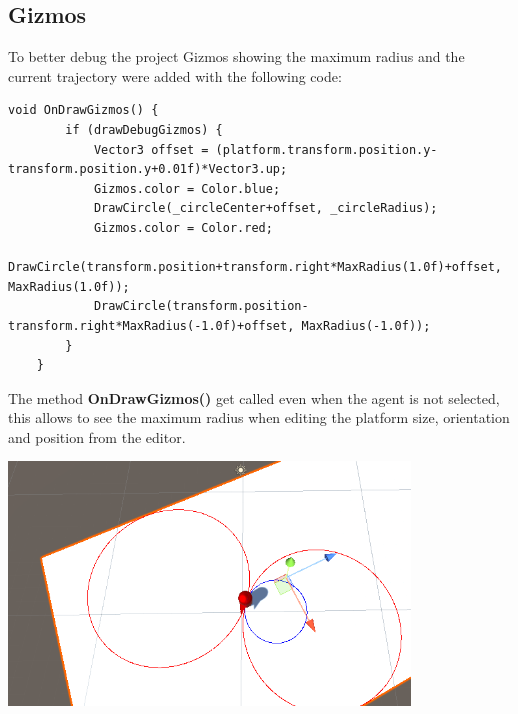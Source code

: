 \documentclass[12pt, a4paper]{article}
\begin{document}
\subsection{Gizmos}
To better debug the project Gizmos showing the maximum radius and the current trajectory were added with the following code:
\begin{lstlisting}[caption={Gizmos drawing}]
    void OnDrawGizmos() {
        if (drawDebugGizmos) {
            Vector3 offset = (platform.transform.position.y-transform.position.y+0.01f)*Vector3.up;
            Gizmos.color = Color.blue;
            DrawCircle(_circleCenter+offset, _circleRadius);
            Gizmos.color = Color.red;
            DrawCircle(transform.position+transform.right*MaxRadius(1.0f)+offset, MaxRadius(1.0f));
            DrawCircle(transform.position-transform.right*MaxRadius(-1.0f)+offset, MaxRadius(-1.0f));
        }
    }
\end{lstlisting}
The method \textbf{OnDrawGizmos()} get called even when the agent is not selected, this allows to see the maximum radius when editing the platform size, orientation and position from the editor.
\begin{center}
    \centering
    \includegraphics[width=0.8\textwidth]{gizmos.png}
\end{center}
\end{document}
